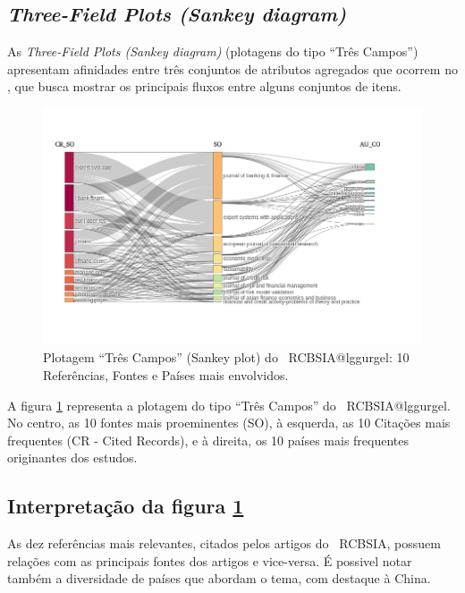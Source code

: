 \subsection{\textit{Three-Field Plots (Sankey diagram)} \label{RCBSIA:Sankey}}

As \textit{Three-Field Plots (Sankey diagram)} (plotagens do tipo ``Três Campos'') apresentam afinidades entre três conjuntos de atributos agregados que ocorrem no \dataset, que busca mostrar os principais fluxos entre alguns conjuntos de itens.

\begin{figure}
    \centering
    \includegraphics[angle=0,width=1\textwidth]{experiments/lggurgel/AnaliseBibliometrica/RiscoBancario/Figs/Descritiva/RCBSIA-GraficoArvore-CR_SO-SO-AU_CO.png}
    \caption{Plotagem ``Três Campos'' (Sankey plot) do \dataset\   RCBSIA@lggurgel: 10 Referências, Fontes e Países mais envolvidos.}
    \label{fig:RCBSIA@lggurgel:ThreeFieldPlot}
\end{figure}

A figura \ref{fig:RCBSIA@lggurgel:ThreeFieldPlot} representa a plotagem do tipo ``Três Campos'' do \dataset\   RCBSIA@lggurgel. No centro, as 10 fontes mais proeminentes (SO), à esquerda, as 10 Citações mais frequentes (CR - Cited Records), e à direita, os 10 países mais frequentes originantes dos estudos.

\subsection{Interpretação da figura \ref{fig:RCBSIA@lggurgel:ThreeFieldPlot}}

As dez referências mais relevantes, citados pelos artigos do \dataset\ RCBSIA, possuem relações com as principais fontes dos artigos e vice-versa. É possivel notar também a diversidade de países que abordam o tema, com destaque à China.

